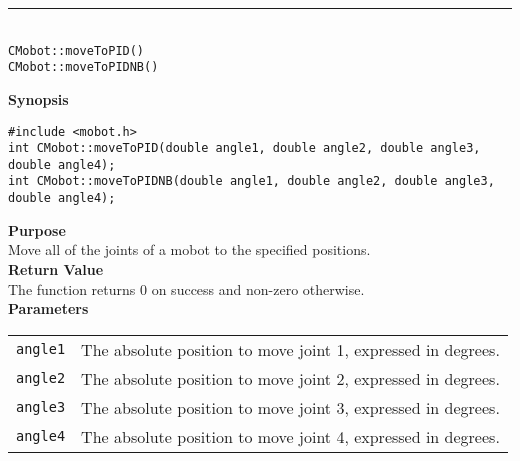 \noindent
\vspace{5pt}
\rule{4.5in}{0.015in}\\
\noindent
{\LARGE \texttt{CMobot::moveToPID()}}\\
{\LARGE \texttt{CMobot::moveToPIDNB()}}\\
{}

\noindent
{\bf Synopsis}
\vspace{-8pt}
\begin{verbatim}
#include <mobot.h>
int CMobot::moveToPID(double angle1, double angle2, double angle3, double angle4);
int CMobot::moveToPIDNB(double angle1, double angle2, double angle3, double angle4);
\end{verbatim}

\noindent
{\bf Purpose}\\
Move all of the joints of a mobot to the specified positions.\\

\noindent
{\bf Return Value}\\
The function returns 0 on success and non-zero otherwise.\\

\noindent
{\bf Parameters}\\
\vspace{-0.1in}
\begin{description}
\item               
\begin{tabular}{p{15 mm}p{105 mm}}
\texttt{angle1} & The absolute position to move joint 1, expressed in degrees. \\
\texttt{angle2} & The absolute position to move joint 2, expressed in degrees. \\
\texttt{angle3} & The absolute position to move joint 3, expressed in degrees. \\
\texttt{angle4} & The absolute position to move joint 4, expressed in degrees. \\
\end{tabular}
\end{description}
\noindent

